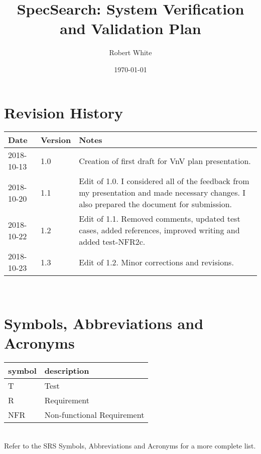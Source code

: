 \documentclass[12pt, titlepage]{article}
\begin{document}
\title{SpecSearch: System Verification and Validation Plan} 
\author{Robert White}
\date{\today}
	
\maketitle


\section{Revision History}

\begin{tabularx}{\textwidth}{p{3cm}p{2cm}X}
\toprule {\bf Date} & {\bf Version} & {\bf Notes}\\
\midrule
2018-10-13 & 1.0 & Creation of first draft for VnV plan presentation.\\
2018-10-20 & 1.1 & Edit of 1.0. I considered all of the feedback from my 
presentation and made necessary changes. I also prepared the document for 
submission. \\ 
2018-10-22 & 1.2 & Edit of 1.1. Removed comments, updated test cases, added 
references, improved writing and added test-NFR2c. \\ 
2018-10-23 & 1.3 & Edit of 1.2. Minor corrections and revisions. \\
\bottomrule
\end{tabularx}

~\newpage

\section{Symbols, Abbreviations and Acronyms}

\renewcommand{\arraystretch}{1.2}
\begin{tabular}{l l} 
  \toprule		
  \textbf{symbol} & \textbf{description}\\
  \midrule 
  T & Test\\
  R & Requirement\\ 
  NFR & Non-functional Requirement\\
  \bottomrule
\end{tabular}\\

Refer to the SRS Symbols, Abbreviations and Acronyms for a more complete list.  

\newpage

\tableofcontents
\end{document}
